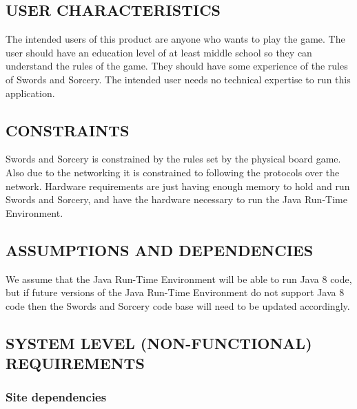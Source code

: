 \documentclass[twoside,letterpaper,pdftex]{article}
\begin{document}
\subsection[USER CHARACTERISTICS]{\rmfamily\bfseries USER CHARACTERISTICS}
\hypertarget{RefHeading17659017292}{}{\itshape
}

The intended users of this product are anyone who wants to play the game. The user
should have an education level of at least middle school so they can understand the
rules of the game. They should have some experience of the rules of Swords and Sorcery.
The intended user needs no technical expertise to run this application.

\subsection[CONSTRAINTS]{\rmfamily\bfseries CONSTRAINTS}
\hypertarget{RefHeading17859017292}{}{\itshape
}

Swords and Sorcery is constrained by the rules set by the physical board game. Also due to the networking it is constrained to following the protocols over the network. Hardware requirements are just having enough memory to hold and run Swords and Sorcery, and have the hardware necessary to run the Java Run-Time Environment. 

\subsection[ASSUMPTIONS AND DEPENDENCIES]{\rmfamily\bfseries ASSUMPTIONS AND
DEPENDENCIES}
\hypertarget{RefHeading18059017292}{}{\itshape
}

We assume that the Java Run-Time Environment will be able to run Java 8 code, but if future versions of the Java Run-Time Environment do not support Java 8 code then the Swords and Sorcery code base will need to be updated accordingly.

\subsection[SYSTEM LEVEL (NON{}-FUNCTIONAL) REQUIREMENTS]{\rmfamily\bfseries
SYSTEM LEVEL (NON-FUNCTIONAL) REQUIREMENTS}
\hypertarget{RefHeading18259017292}{}{\itshape
}

\subsubsection[Site dependencies]{\rmfamily\bfseries Site dependencies}
\hypertarget{RefHeading18459017292}{}{
{\textit{ }}
{\textit{ }}}
\end{document}
